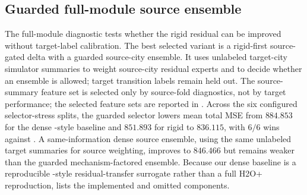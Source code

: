 \begin{center}
\centering
\scriptsize
\resizebox{\textwidth}{!}{}
\label{tab:target-information-ladder}
\end{center}

\subsection{Guarded full-module source ensemble}

The full-module diagnostic tests whether the rigid \ours residual can be improved without target-label calibration.
The best selected variant is a rigid-first source-gated delta with a guarded source-city ensemble.
It uses unlabeled target-city simulator summaries to weight source-city residual experts and to decide whether an ensemble is allowed; target transition labels remain held out.
The source-summary feature set is selected only by source-fold diagnostics, not by target performance; the selected feature sets are reported in .
Across the six configured selector-stress splits, the guarded selector lowers mean total MSE from $884.853$ for the dense \Htwo-style baseline and $851.893$ for rigid \ours to $836.115$, with $6/6$ wins against \Htwo.
A same-information dense \Htwo source ensemble, using the same unlabeled target summaries for source weighting, improves to $846.466$ but remains weaker than the guarded mechanism-factored ensemble.
Because our dense baseline is a reproducible \Htwo-style residual-transfer surrogate rather than a full H2O+ reproduction,  lists the implemented and omitted components.

\begin{table}[t]
\centering
\scriptsize
\resizebox{\textwidth}{!}{}
\caption{Full-module guarded source-ensemble diagnostic. This table uses six configured selector-stress splits, including repeated target cities; it is therefore a source-selection diagnostic rather than the four-target strict leave-one-city-out count in .}
\label{tab:guarded-ensemble}
\end{table}


